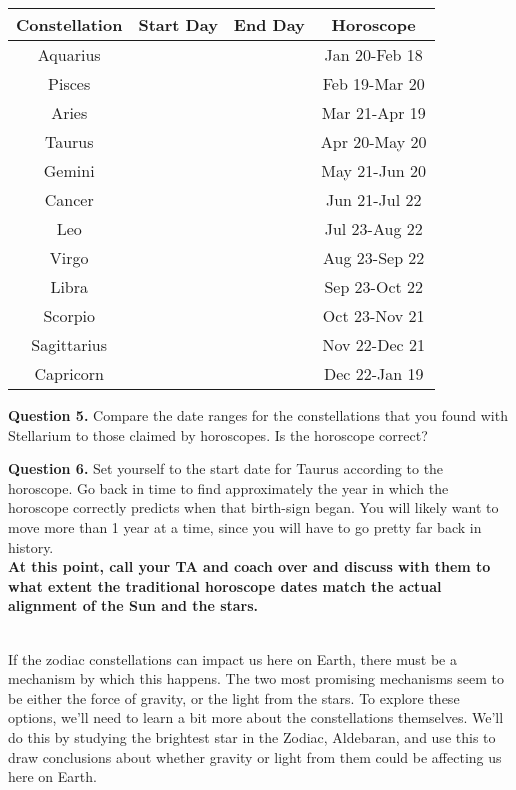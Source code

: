 \documentclass[11pt]{article}
\begin{document}
\begin{center}
	\begin{tabular}{|c|c|c|c|}
		\hline
		Constellation&Start Day&End Day&Horoscope\\ \hline
		Aquarius    & & &Jan 20-Feb 18\\ \hline
		Pisces      & & &Feb 19-Mar 20\\ \hline
		Aries       & & &Mar 21-Apr 19\\ \hline
		Taurus      & & &Apr 20-May 20\\ \hline
		Gemini      & & &May 21-Jun 20\\ \hline
		Cancer      & & &Jun 21-Jul 22\\ \hline
		Leo         & & &Jul 23-Aug 22\\ \hline	
		Virgo       & & &Aug 23-Sep 22\\ \hline
		Libra       & & &Sep 23-Oct 22\\ \hline
		Scorpio     & & &Oct 23-Nov 21\\ \hline
		Sagittarius & & &Nov 22-Dec 21\\ \hline
		Capricorn   & & &Dec 22-Jan 19\\
		\hline
	\end{tabular}
\end{center}

\textbf{Question 5.} Compare the date ranges for the constellations that you found with Stellarium to those claimed by horoscopes. Is the horoscope correct?\\

\vspace{1.5cm}

\textbf{Question 6.} Set yourself to the start date for Taurus according to the horoscope. Go back in time to find approximately the year in which the horoscope correctly predicts when that birth-sign began. You will likely want to move more than 1 year at a time, since you will have to go pretty far back in history.\\


\bf At this point, call your TA and coach over and discuss with them to what extent the traditional horoscope dates match the actual alignment of the Sun and the stars.
\rm



\vspace{1.5cm}
\hrulefill\\

If the zodiac constellations can impact us here on Earth, there must be a mechanism by which this happens. The two most promising mechanisms seem to be either the force of gravity, or the light from the stars. To explore these options, we'll need to learn a bit more about the constellations themselves. We'll do this by studying the brightest star in the Zodiac, Aldebaran, and use this to draw conclusions about whether gravity or light from them could be affecting us here on Earth.\\
\end{document}

